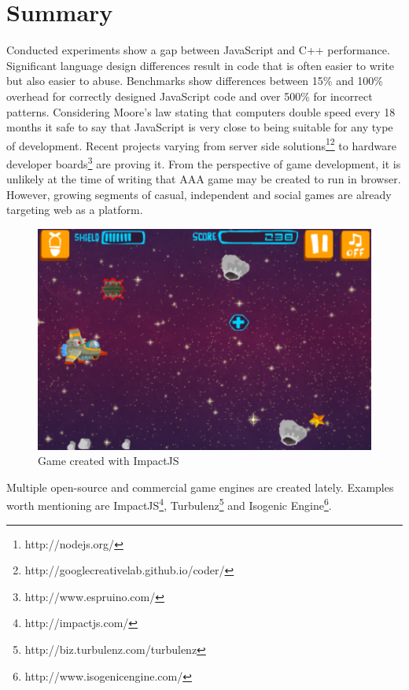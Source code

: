 \chapter{Summary}
\label{cha:summary}

Conducted experiments show a gap between JavaScript and C++ performance. Significant language design differences result in code that is often easier to write but also easier to abuse. Benchmarks show differences between 15\% and 100\% overhead for correctly designed JavaScript code and over 500\% for incorrect patterns.  Considering Moore's law stating that computers double speed every 18 months it safe to say that JavaScript is very close to being suitable for any type of development. Recent projects varying from server side solutions\footnote{http://nodejs.org/}\footnote{http://googlecreativelab.github.io/coder/} to hardware developer boards\footnote{http://www.espruino.com/} are proving it. From the perspective of game development, it is unlikely at the time of writing that AAA game may be created to run in browser. However, growing segments of casual, independent and social games are already targeting web as a platform.

\begin{figure}[h!]
  \caption{Game created with ImpactJS}
  \label{img:impactjs}
  \centering
	\includegraphics[width=12cm]{summary/impactjs.png}
\end{figure}

Multiple open-source and commercial game engines are created lately. Examples worth mentioning are ImpactJS\footnote{http://impactjs.com/}, Turbulenz\footnote{http://biz.turbulenz.com/turbulenz} and Isogenic Engine\footnote{http://www.isogenicengine.com/}.


